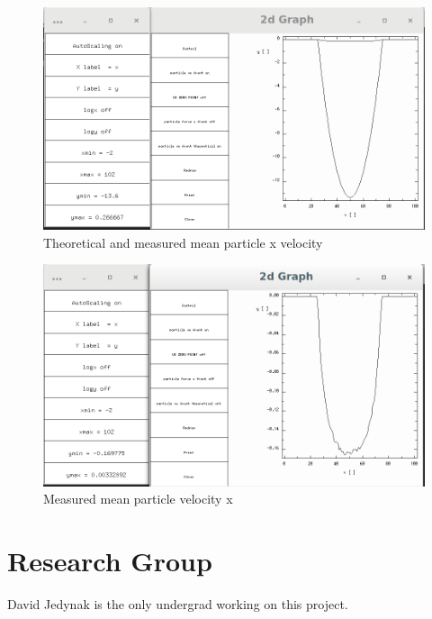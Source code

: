 \documentclass{article}
\begin{document}
\begin{figure}[H]
\includegraphics[scale=0.35]{A3p0.png}
\caption{\label{fig} Theoretical and measured mean particle x velocity}
\end{figure}

\begin{figure}[H]
\includegraphics[scale=0.35]{A2p3.png}
\caption{\label{fig} Measured mean particle velocity x}
\end{figure}


\section{Research Group}
David Jedynak is the only undergrad working on this project.
\end{document}
